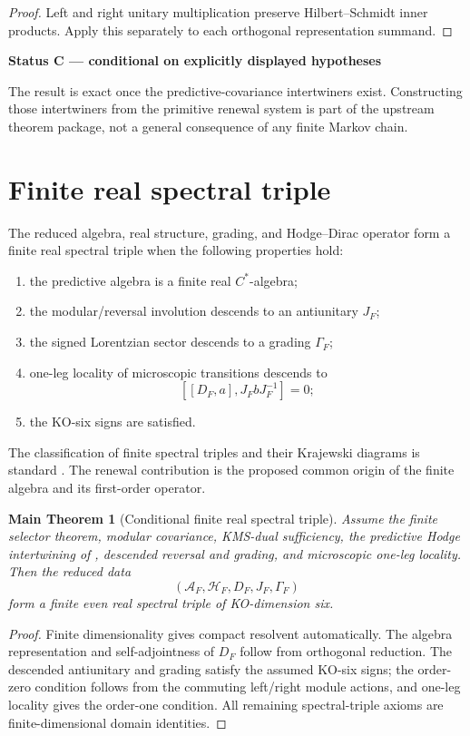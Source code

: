 \documentclass[11pt,oneside,openany]{book}
\numberwithin{equation}{chapter}
\newtheorem{maintheorem}[theorem]{Main Theorem}
\theoremstyle{definition}
\theoremstyle{remark}
\newcommand{\AF}{\mathcal A_F}
\newcommand{\HF}{\mathcal H_F}
\newcommand{\DF}{D_F}
\newcommand{\JF}{J_F}
\newcommand{\GF}{\Gamma_F}
\newenvironment{statusbox}[2]{%
  \par\medskip\noindent
  \begin{center}\begin{minipage}{0.94\textwidth}
  \colorbox{#1!8}{\parbox{\dimexpr\linewidth-2\fboxsep\relax}{\textbf{#2}}}\par\smallskip
}{%
  \end{minipage}\end{center}\medskip
}
\newcommand{\Conditional}[1]{\begin{statusbox}{CondColor}{Status C --- conditional on explicitly displayed hypotheses}#1\end{statusbox}}
\begin{document}
\begin{proof}
Left and right unitary multiplication preserve Hilbert--Schmidt inner products.  Apply this separately to each orthogonal representation summand.
\end{proof}

\Conditional{The result is exact once the predictive-covariance intertwiners exist.  Constructing those intertwiners from the primitive renewal system is part of the upstream theorem package, not a general consequence of any finite Markov chain.}

\section{Finite real spectral triple}
The reduced algebra, real structure, grading, and Hodge--Dirac operator form a finite real spectral triple when the following properties hold:
\begin{enumerate}[label=\textup{(F\arabic*)},leftmargin=2.6em]
\item the predictive algebra is a finite real $C^*$-algebra;
\item the modular/reversal involution descends to an antiunitary $J_F$;
\item the signed Lorentzian sector descends to a grading $\Gamma_F$;
\item one-leg locality of microscopic transitions descends to
\[
 [[D_F,a],J_FbJ_F^{-1}]=0;
\]
\item the KO-six signs are satisfied.
\end{enumerate}
The classification of finite spectral triples and their Krajewski diagrams is standard \cite{Krajewski1998,IochumSchuckerStephan2004,JureitStephan2005,JureitSchuckerStephan2005}.  The renewal contribution is the proposed common origin of the finite algebra and its first-order operator.

\begin{maintheorem}[Conditional finite real spectral triple]
\label{thm:finite-triple}
Assume the finite selector theorem, modular covariance, KMS-dual sufficiency, the predictive Hodge intertwining of , descended reversal and grading, and microscopic one-leg locality.  Then the reduced data
\[
 (\AF,\HF,\DF,\JF,\GF)
\]
form a finite even real spectral triple of KO-dimension six.
\end{maintheorem}

\begin{proof}
Finite dimensionality gives compact resolvent automatically.  The algebra representation and self-adjointness of $D_F$ follow from orthogonal reduction.  The descended antiunitary and grading satisfy the assumed KO-six signs; the order-zero condition follows from the commuting left/right module actions, and one-leg locality gives the order-one condition.  All remaining spectral-triple axioms are finite-dimensional domain identities.
\end{proof}
\end{document}
